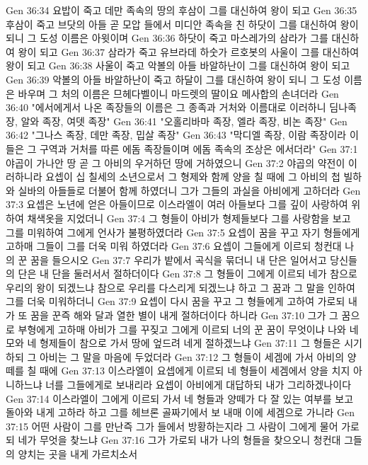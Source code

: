 Gen 36:34  요밥이 죽고 데만 족속의 땅의 후삼이 그를 대신하여 왕이 되고
Gen 36:35  후삼이 죽고 브닷의 아들 곧 모압 들에서 미디안 족속을 친 하닷이 그를 대신하여 왕이 되니 그 도성 이름은 아윗이며
Gen 36:36  하닷이 죽고 마스레가의 삼라가 그를 대신하여 왕이 되고
Gen 36:37  삼라가 죽고 유브라데 하숫가 르호봇의 사울이 그를 대신하여 왕이 되고
Gen 36:38  사울이 죽고 악볼의 아들 바알하난이 그를 대신하여 왕이 되고
Gen 36:39  악볼의 아들 바알하난이 죽고 하달이 그를 대신하여 왕이 되니 그 도성 이름은 바우며 그 처의 이름은 므헤다벨이니 마드렛의 딸이요 메사합의 손녀더라
Gen 36:40  "에서에게서 나온 족장들의 이름은 그 종족과 거처와 이름대로 이러하니 딤나족장, 알와 족장, 여뎃 족장"
Gen 36:41  "오홀리바마 족장, 엘라 족장, 비논 족장"
Gen 36:42  "그나스 족장, 데만 족장, 밉살 족장"
Gen 36:43  "막디엘 족장, 이람 족장이라 이들은 그 구역과 거처를 따른 에돔 족장들이며 에돔 족속의 조상은 에서더라"
Gen 37:1  야곱이 가나안 땅 곧 그 아비의 우거하던 땅에 거하였으니
Gen 37:2  야곱의 약전이 이러하니라 요셉이 십 칠세의 소년으로서 그 형제와 함께 양을 칠 때에 그 아비의 첩 빌하와 실바의 아들들로 더불어 함께 하였더니 그가 그들의 과실을 아비에게 고하더라
Gen 37:3  요셉은 노년에 얻은 아들이므로 이스라엘이 여러 아들보다 그를 깊이 사랑하여 위하여 채색옷을 지었더니
Gen 37:4  그 형들이 아비가 형제들보다 그를 사랑함을 보고 그를 미워하여 그에게 언사가 불평하였더라
Gen 37:5  요셉이 꿈을 꾸고 자기 형들에게 고하매 그들이 그를 더욱 미워 하였더라
Gen 37:6  요셉이 그들에게 이르되 청컨대 나의 꾼 꿈을 들으시오
Gen 37:7  우리가 밭에서 곡식을 묶더니 내 단은 일어서고 당신들의 단은 내 단을 둘러서서 절하더이다
Gen 37:8  그 형들이 그에게 이르되 네가 참으로 우리의 왕이 되겠느냐 참으로 우리를 다스리게 되겠느냐 하고 그 꿈과 그 말을 인하여 그를 더욱 미워하더니
Gen 37:9  요셉이 다시 꿈을 꾸고 그 형들에게 고하여 가로되 내가 또 꿈을 꾼즉 해와 달과 열한 별이 내게 절하더이다 하니라
Gen 37:10  그가 그 꿈으로 부형에게 고하매 아비가 그를 꾸짖고 그에게 이르되 너의 꾼 꿈이 무엇이냐 나와 네 모와 네 형제들이 참으로 가서 땅에 엎드려 네게 절하겠느냐
Gen 37:11  그 형들은 시기하되 그 아비는 그 말을 마음에 두었더라
Gen 37:12  그 형들이 세겜에 가서 아비의 양떼를 칠 때에
Gen 37:13  이스라엘이 요셉에게 이르되 네 형들이 세겜에서 양을 치지 아니하느냐 너를 그들에게로 보내리라 요셉이 아비에게 대답하되 내가 그리하겠나이다
Gen 37:14  이스라엘이 그에게 이르되 가서 네 형들과 양떼가 다 잘 있는 여부를 보고 돌아와 내게 고하라 하고 그를 헤브론 골짜기에서 보 내매 이에 세겜으로 가니라
Gen 37:15  어떤 사람이 그를 만난즉 그가 들에서 방황하는지라 그 사람이 그에게 물어 가로되 네가 무엇을 찾느냐
Gen 37:16  그가 가로되 내가 나의 형들을 찾으오니 청컨대 그들의 양치는 곳을 내게 가르치소서
